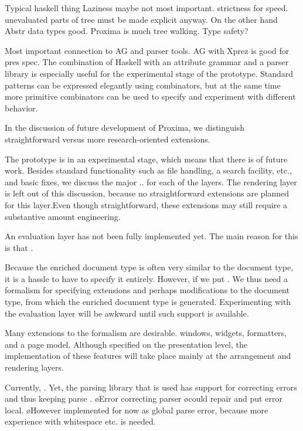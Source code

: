 Typical haskell thing Laziness maybe not most important. strictness for speed. unevaluated parts of tree must be made explicit anyway. On the other hand Abstr data types good. Proxima is much tree walking. Type safety?

Most important connection to AG and parser tools. AG with Xprez is good for pres spec. The combination of Haskell with an attribute grammar and a parser library is especially useful for the experimental stage of the prototype. Standard patterns can be expressed elegantly using combinators, but at the same time more primitive combinators can be used to specify and experiment with different behavior.
\ec

In the discussion of future development of Proxima, we distinguish straightforward versus more research-oriented  extensions.  


The prototype is in an experimental stage, which means that there is of future work. 
Besides standard functionality such as file handling, a search facility, etc., and basic fixes, we discuss the major .. for each of the layers. The rendering layer is left out of this discussion, because no straightforward extensions are planned for this layer.Even though straightforward, these extensions may still require a substantive amount engineering.



An evaluation layer has not been fully implemented yet. The main reason for this is that . 

Because the enriched document type is often very similar to the document type, it is a hassle to have to specify it entirely. However, if we put . We thus need a formalism for specifying extensions and perhaps modifications to the document type, from which the enriched document type is generated. Experimenting with the evaluation layer will be awkward until such support is available.


Many extensions to the  formalism are desirable. windows, widgets, formatters, and a page model. Although specified on the presentation level, the implementation of these features will take place mainly at the arrangement and rendering layers.

Currently, . Yet, the parsing library that is used has support for correcting errors and thus keeping parse .
\bl
\o Error correcting parser
\o could repair and put error local.
\o However implemented for now as global parse error, because more experience with whitespace etc. is needed.
\el

